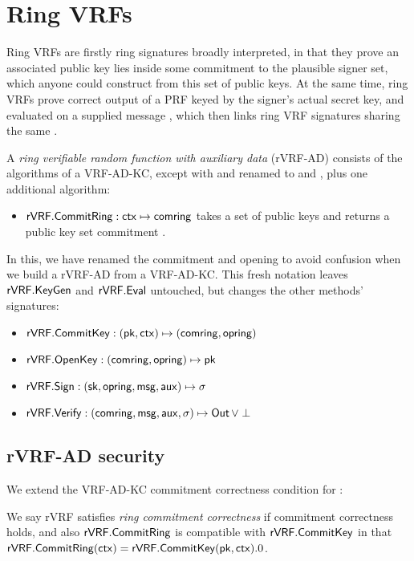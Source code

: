 
\section{Ring VRFs}
\label{sec:rvrf_def}

Ring VRFs are firstly ring signatures broadly interpreted, in that they
prove an associated public key lies inside some commitment \comring to
the plausible signer set,
 which anyone could construct from this set of public keys.
At the same time, ring VRFs prove correct output of a PRF keyed by
the signer's actual secret key, and evaluated on a supplied message \msg,
 which then links ring VRF signatures sharing the same \msg.

A {\em ring verifiable random function with auxiliary data} (rVRF-AD)
consists of the algorithms of a VRF-AD-KC, except with
 \compk and \openpk renamed to \comring and \openring,
 plus one additional algorithm:
\begin{itemize}
\item ${\mathsf{rVRF}}.{\mathsf{CommitRing}} : \mathsf{ctx} \mapsto \mathsf{comring}$ takes a set \ctx of
 public keys and returns a public key set commitment \comring.
\end{itemize}

\def\rSign{\Sign}
\def\rVerify{\Verify}

In this, we have renamed the commitment and opening to avoid confusion
when we build a rVRF-AD from a VRF-AD-KC.  This fresh notation leaves
${\mathsf{rVRF}}.{\mathsf{KeyGen}}$ and ${\mathsf{rVRF}}.{\mathsf{Eval}}$ untouched, but
 changes the other methods' signatures:
\begin{itemize}
\item ${\mathsf{rVRF}}.{\mathsf{CommitKey}} : (\mathsf{pk},\mathsf{ctx}) \mapsto (\mathsf{comring},\mathsf{opring})$
\item ${\mathsf{rVRF}}.{\mathsf{OpenKey}} : (\mathsf{comring},\mathsf{opring}) \mapsto \mathsf{pk}$
\item $\rVRF.\rSign : (\sk,\openring,\msg,\aux) \mapsto \sigma$
\item $\rVRF.\rVerify : (\comring,\msg,\aux,\sigma) \mapsto \Out \, \lor \perp$
\end{itemize}

\subsection{rVRF-AD security}

We extend the VRF-AD-KC commitment correctness condition for \CommitRing:

\begin{definition}
We say rVRF satisfies {\em ring commitment correctness} if
commitment correctness holds, and also ${\mathsf{rVRF}}.{\mathsf{CommitRing}}$ is 
 compatible with ${\mathsf{rVRF}}.{\mathsf{CommitKey}}$ in that
  ${\mathsf{rVRF}}.{\mathsf{CommitRing}}(\mathsf{ctx}) = {\mathsf{rVRF}}.{\mathsf{CommitKey}}(\mathsf{pk},\mathsf{ctx}).0$.
\end{definition}


